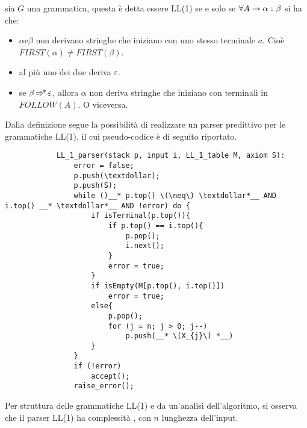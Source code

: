 \documentclass{subfiles}
\begin{document}
\begin{Definition*}
    sia \(G\) una grammatica, questa è detta essere LL(1) se e solo se \(\forall \Grammar{A}{\alpha}[\beta]\) si ha che:
    \begin{itemize}
        \item \(\alpha \text{e} \beta\) non derivano stringhe che iniziano con uno stesso terminale \(a\).
              Cioè \(FIRST(\alpha) \neq FIRST(\beta)\).
        \item al più uno dei due deriva \(\varepsilon\).
        \item se \(\beta \operatorname{\Rightarrow\hspace{-5pt}*} \varepsilon\), allora \(\alpha\) non deriva stringhe che iniziano con terminali in \(FOLLOW(A)\). O viceversa.
    \end{itemize}
\end{Definition*}
\begin{Algorithm*}
    Dalla definizione segue la possibilità di realizzare un parser predittivo per le grammatiche LL(1), il cui pseudo-codice è di seguito riportato.
    \begin{center}
        \begin{lstlisting}
            LL_1_parser(stack p, input i, LL_1_table M, axiom S):
                error = false;
                p.push(\textdollar);
                p.push(S);
                while ()__* p.top() \(\neq\) \textdollar*__ AND i.top() __* \textdollar*__ AND !error) do {
                    if isTerminal(p.top()){
                        if p.top() == i.top(){
                            p.pop();
                            i.next();
                        }
                        error = true;
                    }
                    if isEmpty(M[p.top(), i.top()])
                        error = true;
                    else{
                        p.pop();
                        for (j = n; j > 0; j--)
                            p.push(__* \(X_{j}\) *__)
                    }
                }
                if (!error)
                    accept();
                raise_error();
        \end{lstlisting}
    \end{center}
\end{Algorithm*}
Per struttura delle grammatiche LL(1) e da un'analisi dell'algoritmo, si osserva che il parser LL(1) ha complessità ,
con \(n\) lunghezza dell'input.
\end{document}
